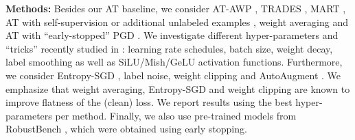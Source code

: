 \textbf{Methods:}
%
Besides our AT baseline, we consider AT-AWP \cite{WuNIPS2016}, TRADES \cite{ZhangICML2019}, MART \cite{WangICLR2020}, AT with self-supervision \cite{HendrycksNIPS2019} or additional unlabeled examples \cite{CarmonNIPS2019,UesatoNIPS2019}, weight averaging \cite{IzmailovUAI2018} and AT with ``early-stopped'' PGD \cite{ZhangICML2020}. We investigate different hyper-parameters and ``tricks'' recently studied in \cite{PangARXIV2020b,GowalARXIV2020}: learning rate schedules, batch size, weight decay, label smoothing \cite{SzegedyCVPR2016} as well as SiLU/Mish/GeLU \cite{ElfwingNN2018,MisraBMVC2020,HendrycksARXIV2016} activation functions. Furthermore, we consider Entropy-SGD \cite{ChaudhariICLR2017}, label noise, weight clipping \cite{StutzMLSYS2021} and AutoAugment \cite{CubukARXIV2018}. We emphasize that weight averaging, Entropy-SGD and weight clipping are known to improve flatness of the (clean) loss.
We report results using the best hyper-parameters per method. Finally, we also use pre-trained models from RobustBench \cite{CroceARXIV2020b}, which were obtained using early stopping. 


